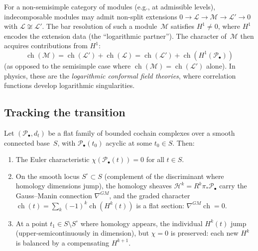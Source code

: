 \begin{example}\label{ex:logarithmic-modules}
For a non-semisimple category of modules (e.g., at admissible levels),
indecomposable modules may admit non-split extensions
$0 \to \mathcal{L} \to \mathcal{M} \to \mathcal{L}' \to 0$
with $\mathcal{L} \not\cong \mathcal{L}'$.  The bar resolution of
such a module~$\mathcal{M}$ satisfies $H^1 \neq 0$, where $H^1$
encodes the extension data (the ``logarithmic partner'').  The
character of~$\mathcal{M}$ then acquires contributions from $H^1$:
\[
\operatorname{ch}(\mathcal{M})
= \operatorname{ch}(\mathcal{L}') + \operatorname{ch}(\mathcal{L})
= \operatorname{ch}(\mathcal{L}')
  + \operatorname{ch}(H^1(\mathcal{P}_\bullet))
\]
(as opposed to the semisimple case where
$\operatorname{ch}(\mathcal{M}) = \operatorname{ch}(\mathcal{L}')$
alone).  In physics, these are the \emph{logarithmic conformal field
theories}, where correlation functions develop logarithmic
singularities.
\end{example}

\subsection{Tracking the transition}

\begin{theorem}
\label{thm:deformation-acyclicity}
Let $(\mathcal{P}_\bullet, d_t)$ be a flat family of bounded cochain
complexes over a smooth connected base~$S$, with $\mathcal{P}_\bullet(t_0)$
acyclic at some $t_0 \in S$.  Then:
\begin{enumerate}
\item The Euler characteristic $\chi(\mathcal{P}_\bullet(t)) = 0$ for all
$t \in S$.
\item On the smooth locus $S^{\circ} \subset S$ (complement of the discriminant
where homology dimensions jump), the homology sheaves
$\mathcal{H}^k = R^k\pi_*\mathcal{P}_\bullet$ carry the Gauss--Manin
connection $\nabla^{GM}$, and the graded character
$\operatorname{ch}(t) = \sum_k (-1)^k \operatorname{ch}(H^k(t))$ is a
flat section: $\nabla^{GM}\operatorname{ch} = 0$.
\item At a point $t_1 \in S \setminus S^{\circ}$ where homology appears,
the individual $H^k(t)$ jump (upper-semicontinuously in dimension), but
$\chi = 0$ is preserved: each new $H^k$ is balanced by a compensating $H^{k+1}$.
\end{enumerate}
\end{theorem}

